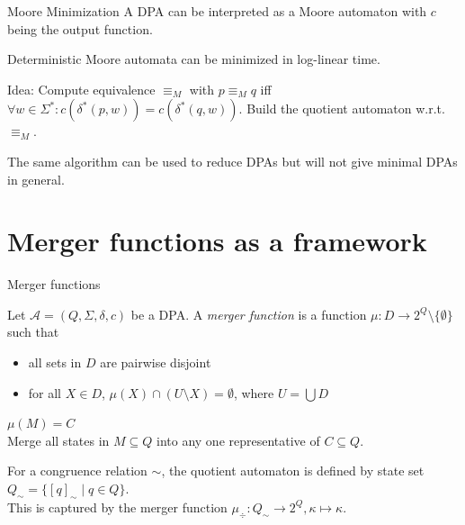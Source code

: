 \begin{frame}{Moore Minimization}
A DPA can be interpreted as a Moore automaton with $c$ being the output function.

\begin{theorem}
	Deterministic Moore automata can be minimized in log-linear time.
\end{theorem}

Idea: Compute equivalence $\equiv_M$ with $p \equiv_M q$ iff $\forall w \in \Sigma^*: c(\delta^*(p, w)) = c(\delta^*(q, w))$. Build the quotient automaton w.r.t. $\equiv_M$.

The same algorithm can be used to reduce DPAs but will not give minimal DPAs in general.
\end{frame}




\section{Merger functions as a framework}
\begin{frame}{Merger functions}
\begin{defn}
	Let $\mathcal{A} = (Q, \Sigma, \delta, c)$ be a DPA. A \emph{merger function} is a function $\mu : D \rightarrow 2^Q \setminus \{\emptyset\}$ such that 
	\begin{itemize}
		\item all sets in $D$ are pairwise disjoint
		\item for all $X \in D$, $\mu(X) \cap (U \setminus X) = \emptyset$, where $U = \bigcup D$
	\end{itemize}
\end{defn}

$\mu(M) = C$ \\
Merge all states in $M \subseteq Q$ into any one representative of $C \subseteq Q$.

\vspace{.5cm}

For a congruence relation $\sim$, the quotient automaton is defined by state set $Q_\sim = \{ [q]_\sim \mid q \in Q\}$. \\
This is captured by the merger function $\mu_\div : Q_\sim \rightarrow 2^Q , \kappa \mapsto \kappa$.
\end{frame}




